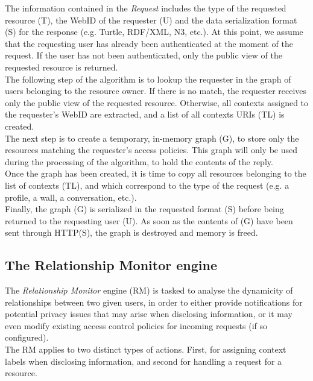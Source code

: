 The information contained in the \textit{Request} includes the type of the requested resource (T), the WebID of the requester (U) and the data serialization format (S) for the response (e.g. Turtle, RDF/XML, N3, etc.). At this point, we assume that the requesting user has already been authenticated at the moment of the request. If the user has not been authenticated, only the public view of the requested resource is returned.\\

The following step of the algorithm is to lookup the requester in the graph of users belonging to the resource owner. If there is no match, the requester receives only the public view of the requested resource. Otherwise, all contexts assigned to the requester's WebID are extracted, and a list of all contexts URIs (TL) is created.\\

The next step is to create a temporary, in-memory graph (G), to store only the resources matching the requester's access policies. This graph will only be used during the processing of the algorithm, to hold the contents of the reply.\\

Once the graph has been created, it is time to copy all resources belonging to the list of contexts (TL), and which correspond to the type of the request (e.g. a profile, a wall, a conversation, etc.).\\

Finally, the graph (G) is serialized in the requested format (S) before being returned to the requesting user (U). As soon as the contents of (G) have been sent through HTTP(S), the graph is destroyed and memory is freed.


\subsection{The Relationship Monitor engine}
\label{subsec:rme}
The \textit{Relationship Monitor} engine (RM) is tasked to analyse the dynamicity of relationships between two given users, in order to either provide notifications for potential privacy issues that may arise when disclosing information, or it may even modify existing access control policies for incoming requests (if so configured).\\

The RM applies to two distinct types of actions. First, for assigning context labels when disclosing information, and second for handling a request for a resource.

